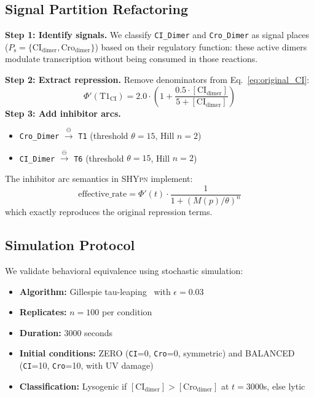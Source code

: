\documentclass[twocolumn,10pt]{article}
\newcommand{\Ps}{P_{\text{s}}}
\newcommand{\shypn}{\textsc{SHYpn}}
\begin{document}
\subsection{Signal Partition Refactoring}

\textbf{Step 1: Identify signals.} We classify \texttt{CI\_Dimer} and \texttt{Cro\_Dimer} as signal places ($\Ps = \{\text{CI}_{\text{dimer}}, \text{Cro}_{\text{dimer}}\}$) based on their regulatory function: these active dimers modulate transcription without being consumed in those reactions.

\textbf{Step 2: Extract repression.} Remove denominators from Eq.~\ref{eq:original_CI}:
%
\begin{equation}
\Phi'(\text{T1}_{\text{CI}}) = 2.0 \cdot \left(1 + \frac{0.5 \cdot [\text{CI}_{\text{dimer}}]}{5 + [\text{CI}_{\text{dimer}}]}\right) \label{eq:refactored_CI}
\end{equation}
%
\textbf{Step 3: Add inhibitor arcs.}
\begin{itemize}
\item \texttt{Cro\_Dimer} $\xrightarrow{\ominus}$ \texttt{T1} (threshold $\theta=15$, Hill $n=2$)
\item \texttt{CI\_Dimer} $\xrightarrow{\ominus}$ \texttt{T6} (threshold $\theta=15$, Hill $n=2$)
\end{itemize}
%
The inhibitor arc semantics in \shypn{} implement:
%
\begin{equation}
\text{effective\_rate} = \Phi'(t) \cdot \frac{1}{1 + (M(p)/\theta)^n}
\end{equation}
%
which exactly reproduces the original repression terms.

\subsection{Simulation Protocol}

We validate behavioral equivalence using stochastic simulation:

\begin{itemize}
\item \textbf{Algorithm:} Gillespie tau-leaping~\cite{gillespie2001approximate} with $\epsilon=0.03$
\item \textbf{Replicates:} $n=100$ per condition
\item \textbf{Duration:} 3000 seconds
\item \textbf{Initial conditions:} ZERO (\texttt{CI}=0, \texttt{Cro}=0, symmetric) and BALANCED (\texttt{CI}=10, \texttt{Cro}=10, with UV damage)
\item \textbf{Classification:} Lysogenic if $[\text{CI}_{\text{dimer}}] > [\text{Cro}_{\text{dimer}}]$ at $t=3000$s, else lytic
\end{itemize}
\end{document}
